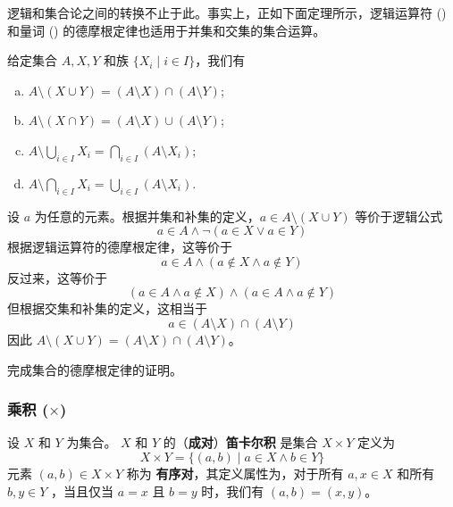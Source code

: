 逻辑和集合论之间的转换不止于此。事实上，正如下面定理所示，逻辑运算符 () 和量词 () 的德摩根定律也适用于并集和交集的集合运算。

\begin{theorem}[集合的德摩根定律]
\label{thmDeMorganForSets}
给定集合 $A,X,Y$ 和族 $\{ X_i \mid i \in I \}$，我们有
\begin{enumerate}[(a)] 
\item $A \setminus (X \cup Y) = (A \setminus X) \cap (A \setminus Y)$;
\item $A \setminus (X \cap Y) = (A \setminus X) \cup (A \setminus Y)$;
\item $\displaystyle A \setminus \bigcup_{i \in I} X_i = \bigcap_{i \in I} (A \setminus X_i)$;
\item $\displaystyle A \setminus \bigcap_{i \in I} X_i = \bigcup_{i \in I} (A \setminus X_i)$.
\end{enumerate}
\end{theorem}

\begin{cproof}[of (a)]
设 $a$ 为任意的元素。根据并集和补集的定义，$a \in A \setminus (X \cup Y)$ 等价于逻辑公式
\[ a \in A \wedge \neg (a \in X \vee a \in Y) \]
根据逻辑运算符的德摩根定律，这等价于
\[ a \in A \wedge (a \not\in X \wedge a \not\in Y) \]
反过来，这等价于
\[ (a \in A \wedge a \not\in X) \wedge (a \in A \wedge a \not\in Y) \]
但根据交集和补集的定义，这相当于
\[ a \in (A \setminus X) \cap (A \setminus Y) \]
因此 $A \setminus (X \cup Y) = (A \setminus X) \cap (A \setminus Y)$。
\end{cproof}

\begin{exercise}
完成集合的德摩根定律的证明。
\end{exercise}

\subsubsection*{乘积 ($\times$)}

\begin{definition}
\label{defCartesianProductPairwise}
设 $X$ 和 $Y$ 为集合。 $X$ 和 $Y$ 的（\textbf{成对}）\textbf{笛卡尔积} 是集合 $X \times Y$  定义为
\[ X \times Y = \{ (a,b) \mid a \in X \wedge b \in Y \} \]
元素 $(a,b) \in X \times Y$ 称为 \textbf{有序对}，其定义属性为，对于所有 $a,x \in X$ 和所有 $b,y \in Y$ ，当且仅当 $a=x$ 且 $b=y$ 时，我们有 $(a,b) = (x,y)$。
\end{definition}

